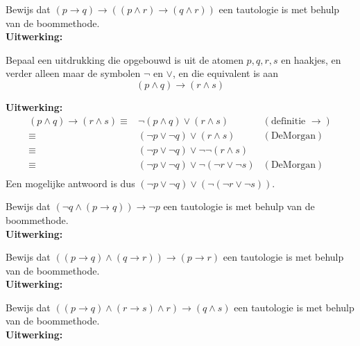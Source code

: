 \begin{answer}
Bewijs dat $(p\rightarrow q)\rightarrow((p\land r)\rightarrow (q\land r))$ een tautologie is met behulp van de boommethode.\\[2.5pt]

\noindent\textbf{Uitwerking:}\todo
\end{answer}

\begin{answer}
Bepaal een uitdrukking die opgebouwd is uit de atomen $p,q,r,s$ en haakjes, en verder alleen maar de symbolen $\neg$ en $\lor$, en die equivalent is aan
    $$(p\land q)\rightarrow(r\land s)$$
    
\noindent\textbf{Uitwerking:}
$$\begin{array}{rll}
     (p\land q)\rightarrow (r\land s)\equiv&\neg(p\land q)\lor(r\land s)&(\text{definitie }\rightarrow)\\
     \equiv&(\neg p\lor\neg q)\lor(r\land s)&(\text{DeMorgan})\\
     \equiv&(\neg p\lor\neg q)\lor\neg\neg(r\land s)&\\
     \equiv&(\neg p\lor\neg q)\lor\neg(\neg r\lor\neg s)&(\text{DeMorgan})\\
\end{array}$$
Een mogelijke antwoord is dus $(\neg p\lor\neg q)\lor(\neg(\neg r\lor \neg s))$.
\end{answer}

\begin{answer}
Bewijs dat $(\neg q\land(p\rightarrow q))\rightarrow\neg p$ een tautologie is met behulp van de boommethode.\\[2.5pt]

\noindent\textbf{Uitwerking:}\todo
\end{answer}

\begin{answer}
Bewijs dat $((p\rightarrow q)\land(q\rightarrow r))\rightarrow (p\rightarrow r)$ een tautologie is met behulp van de boommethode.\\[2.5pt]

\noindent\textbf{Uitwerking:}\todo
\end{answer}

\begin{answer}
Bewijs dat $((p\rightarrow q)\wedge(r\rightarrow s) \wedge r)\rightarrow (q\wedge s)$ een tautologie is met behulp van de boommethode.\\[2.5pt]

\noindent\textbf{Uitwerking:}\todo
\end{answer}

